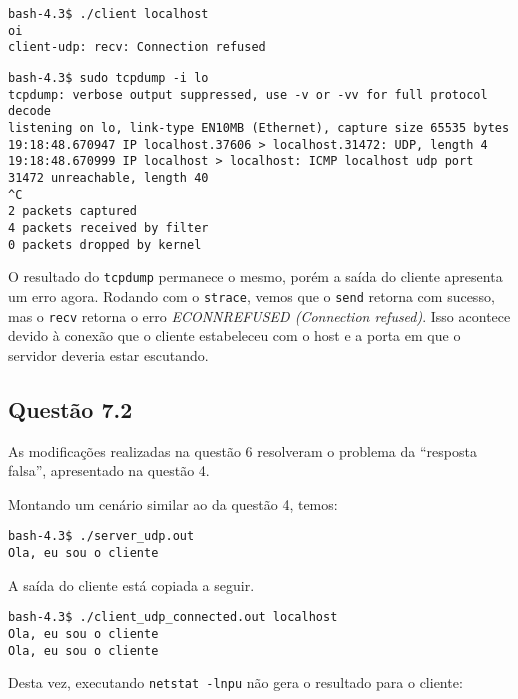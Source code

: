 \documentclass[a4paper,10pt]{article}
\begin{document}
\begin{lstlisting}
bash-4.3$ ./client localhost
oi
client-udp: recv: Connection refused

\end{lstlisting}

\begin{lstlisting}
bash-4.3$ sudo tcpdump -i lo
tcpdump: verbose output suppressed, use -v or -vv for full protocol decode
listening on lo, link-type EN10MB (Ethernet), capture size 65535 bytes
19:18:48.670947 IP localhost.37606 > localhost.31472: UDP, length 4
19:18:48.670999 IP localhost > localhost: ICMP localhost udp port 31472 unreachable, length 40
^C
2 packets captured
4 packets received by filter
0 packets dropped by kernel

\end{lstlisting}

O resultado do {\tt tcpdump} permanece o mesmo, porém a saída do cliente apresenta um erro agora. Rodando com o {\tt strace}, vemos que o {\tt send} retorna com sucesso, mas o {\tt recv} retorna o erro \textit{ECONNREFUSED (Connection refused)}. Isso acontece devido à conexão que o cliente estabeleceu com o host e a porta em que o servidor deveria estar escutando.

\subsection{Questão 7.2}
As modificações realizadas na questão 6 resolveram o problema da ``resposta falsa'', apresentado na questão 4.

Montando um cenário similar ao da questão 4, temos:

\begin{lstlisting}
bash-4.3$ ./server_udp.out
Ola, eu sou o cliente

\end{lstlisting}

A saída do cliente está copiada a seguir.

\begin{lstlisting}
bash-4.3$ ./client_udp_connected.out localhost
Ola, eu sou o cliente
Ola, eu sou o cliente

\end{lstlisting}

Desta vez, executando {\tt netstat -lnpu} não gera o resultado para o cliente:
\end{document}
